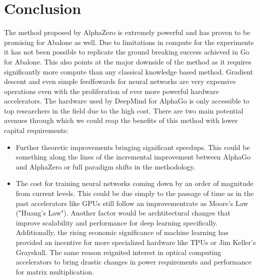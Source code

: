 \chapter{Conclusion}
The method proposed by AlphaZero is extremely powerful and has proven to be promising for Abalone as well. Due to limitations in compute for the experiments it has not been possible to replicate the ground breaking success achieved in Go for Abalone. This also points at the major downside of the method as it requires significantly more compute than any classical knowledge based method. Gradient descent and even simple feedfowards for neural networks are very expensive operations even with the proliferation of ever more powerful hardware accelerators. The hardware used by DeepMind for AlphaGo is only accessible to top researchers in the field due to the high cost. There are two main potential avenues through which we could reap the benefits of this method with lower capital requirements:

\begin{itemize}
    \item Further theoretic improvements bringing significant speedups. This could be something along the lines of the incremental improvement between AlphaGo and AlphaZero or full paradigm shifts in the methodology.
    \item The cost for training neural networks coming down by an order of magnitude from current levels. This could be due simply to the passage of time as in the past accelerators like GPUs still follow an improvementrate as Moore's Law ("Huang's Law"). \cite{noauthor_huangs_2021}  Another factor would be archtitectural changes that improve scalability and performance for deep learning specifically. Additionally, the rising economic significance of machine learning has provided an incentive for more specialized hardware like TPUs \cite{noauthor_tpu_nodate} or Jim Keller's Grayskull. \cite{noauthor_grayskull_nodate} The same reason reignited interest in optical computing accelerators to bring drastic changes in power requirements and performance for matrix multiplication. \cite{noauthor_lightmatter_nodate,noauthor_lightelligence_nodate}
\end{itemize}
